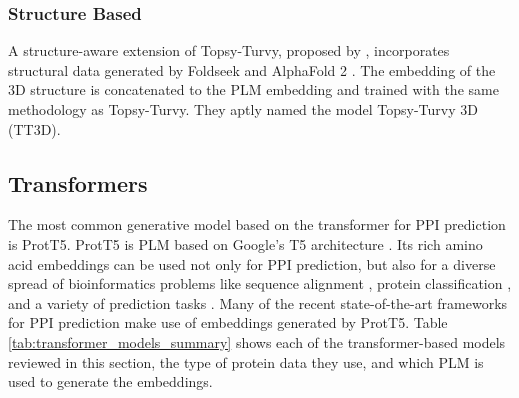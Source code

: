 \documentclass{article}
\begin{document}
\subsubsection{Structure Based}
A structure-aware extension of Topsy-Turvy, proposed by \citet{sledzieski_tt3d_2023}, incorporates structural data generated by Foldseek and AlphaFold 2 \citep{beck_xlstm_2024}. The embedding of the 3D structure is concatenated to the PLM embedding and trained with the same methodology as Topsy-Turvy. They aptly named the model Topsy-Turvy 3D (TT3D).

\subsection{Transformers}
The most common generative model based on the transformer for PPI prediction is ProtT5. ProtT5 is PLM based on Google's T5 architecture \citep{raffel_exploring_2020}. Its rich amino acid embeddings can be used not only for PPI prediction, but also for a diverse spread of bioinformatics problems like sequence alignment \citep{spicer_evaluating_2025}, protein classification \citep{shoombuatong_advancing_2025}, and a variety of prediction tasks \citep{schmirler_fine-tuning_2024}. Many of the recent state-of-the-art frameworks for PPI prediction make use of embeddings generated by ProtT5. Table \ref{tab:transformer_models_summary} shows each of the transformer-based models reviewed in this section, the type of protein data they use, and which PLM is used to generate the embeddings.
\end{document}
